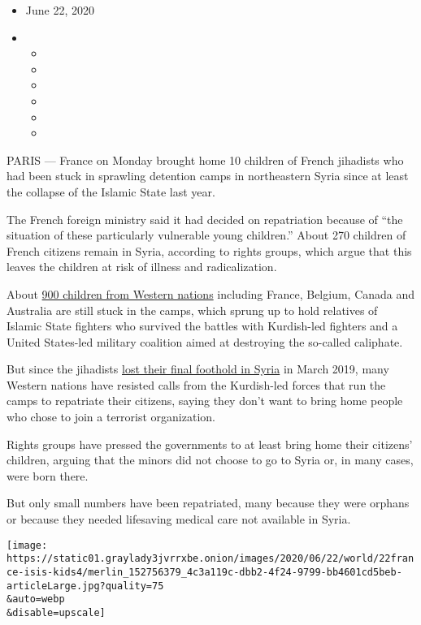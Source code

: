 \begin{itemize}
\item
  June 22, 2020
\item
  \begin{itemize}
  \item
  \item
  \item
  \item
  \item
  \item
  \end{itemize}
\end{itemize}

PARIS --- France on Monday brought home 10 children of French jihadists
who had been stuck in sprawling detention camps in northeastern Syria
since at least the collapse of the Islamic State last year.

The French foreign ministry said it had decided on repatriation because
of ``the situation of these particularly vulnerable young children.''
About 270 children of French citizens remain in Syria, according to
rights groups, which argue that this leaves the children at risk of
illness and radicalization.

About
\href{https://www.nytimes3xbfgragh.onion/2020/05/31/world/middleeast/isis-children-syria-camps.html}{900
children from Western nations} including France, Belgium, Canada and
Australia are still stuck in the camps, which sprung up to hold
relatives of Islamic State fighters who survived the battles with
Kurdish-led fighters and a United States-led military coalition aimed at
destroying the so-called caliphate.

But since the jihadists
\href{https://www.nytimes3xbfgragh.onion/2019/03/23/world/middleeast/isis-syria-caliphate.html}{lost
their final foothold in Syria} in March 2019, many Western nations have
resisted calls from the Kurdish-led forces that run the camps to
repatriate their citizens, saying they don't want to bring home people
who chose to join a terrorist organization.

Rights groups have pressed the governments to at least bring home their
citizens' children, arguing that the minors did not choose to go to
Syria or, in many cases, were born there.

But only small numbers have been repatriated, many because they were
orphans or because they needed lifesaving medical care not available in
Syria.

\texttt{[image: https://static01.graylady3jvrrxbe.onion/images/2020/06/22/world/22france-isis-kids4/merlin\_152756379\_4c3a119c-dbb2-4f24-9799-bb4601cd5beb-articleLarge.jpg?quality=75\\\&auto=webp\\\&disable=upscale]}


